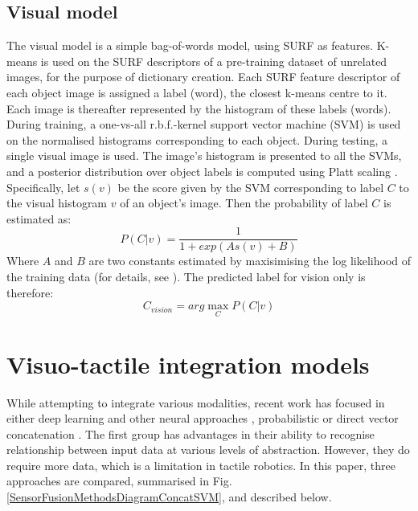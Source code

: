 \documentclass[9pt,technote]{IEEEtran}  %
\begin{document}
\subsection{Visual model}
\label{sec_visualmodel}
The visual model is a simple bag-of-words model, using SURF \cite{Bay2006} as features. K-means %
is used on the SURF descriptors of a pre-training dataset of unrelated images, for the purpose of dictionary creation. Each SURF feature descriptor of each object image is assigned a label (word), the closest k-means centre to it. Each image is thereafter represented by the histogram of these labels (words). During training, a one-vs-all r.b.f.-kernel support vector machine (SVM) is used on the normalised histograms corresponding to each object. During testing, a single visual image is used. The image's histogram is presented to all the SVMs, and a posterior distribution over object labels is computed using Platt scaling \cite{Platt1999}. Specifically, let $s(v)$ be the score given by the SVM corresponding to label $C$ to the visual histogram $v$ of an object's image. Then the probability of label $C$ is estimated as:
\begin{equation}
P(C|v) = \frac{1}{1+exp(As(v)+B)} 
\label{eqn_pcv}
\end{equation}
Where $A$ and $B$ are two constants estimated by maxisimising the log likelihood of the training data (for details, see \cite{Platt1999}). The predicted label for vision only is therefore:
\begin{equation}
C_{vision} = arg \max_{C} P(C | v)
\label{eqn_cvision}
\end{equation}

\section{Visuo-tactile integration models}
\label{sec_visuotactilemodels}
While attempting to integrate various modalities, recent work has focused in either deep learning and other neural approaches \cite{NIPS2012_4683,Wu2013a,Schmitz2014}, probabilistic \cite{Liu2012a} or direct vector concatenation \cite{Yang2015}. The first group has advantages in their ability to recognise relationship between input data at various levels of abstraction. However, they do require more data, which is a limitation in tactile robotics. In this paper, three approaches are compared, summarised in Fig. \ref{SensorFusionMethodsDiagramConcatSVM}, and described below.

\begin{figure}
	\centering
	\end{figure}
\end{document}
